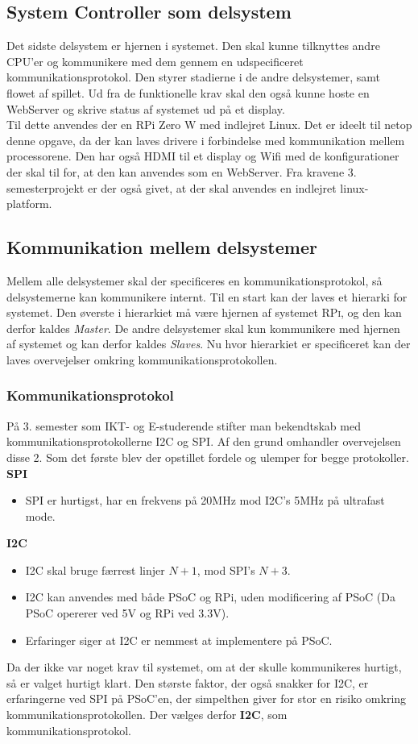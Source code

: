 \documentclass[Rapport/Rapport_main.tex]{subfiles}
\begin{document}
\subsection{System Controller som delsystem}
Det sidste delsystem er hjernen i systemet. Den skal kunne tilknyttes andre CPU'er og kommunikere med dem gennem en udspecificeret kommunikationsprotokol. Den styrer stadierne i de andre delsystemer, samt flowet af spillet. Ud fra de funktionelle krav  skal den også kunne hoste en WebServer og skrive status af systemet ud på et display.\\
Til dette anvendes der en RPi Zero W med indlejret Linux. Det er ideelt til netop denne opgave, da der kan laves drivere i forbindelse med kommunikation mellem processorene. Den har også HDMI til et display og  Wifi med de konfigurationer der skal til for, at den kan anvendes som en WebServer. Fra kravene 3. semesterprojekt\cite{Universitet2018} er der også givet, at der skal anvendes en indlejret linux-platform. 

\subsection{Kommunikation mellem delsystemer}
Mellem alle delsystemer skal der specificeres en kommunikationsprotokol, så delsystemerne kan kommunikere internt. Til en start kan der laves et hierarki for systemet. Den øverste i hierarkiet må være hjernen af systemet \textsc{RPi}, og den kan derfor kaldes \textit{Master}. De andre delsystemer skal kun kommunikere med hjernen af systemet og kan derfor kaldes \textit{Slaves}. Nu hvor hierarkiet er specificeret kan der laves overvejelser omkring kommunikationsprotokollen.
\subsubsection{Kommunikationsprotokol}
På 3. semester som IKT- og E-studerende stifter man bekendtskab med kommunikationsprotokollerne I2C\cite{i2c_protocol} og SPI\cite{spi_protocol}. Af den grund omhandler overvejelsen disse 2. Som det første blev der opstillet fordele og ulemper for begge protokoller.\\
\textbf{SPI}
\begin{itemize}
    \item SPI er hurtigst, har en frekvens på 20MHz mod I2C's 5MHz på ultrafast mode.
\end{itemize}
\textbf{I2C}
\begin{itemize}
    \item I2C skal bruge færrest linjer $N+1$, mod SPI's $N+3$.
    \item I2C kan anvendes med både PSoC og RPi, uden modificering af PSoC (Da PSoC opererer ved 5V og RPi ved 3.3V).
    \item Erfaringer siger at I2C er nemmest at implementere på PSoC. 
\end{itemize}
Da der ikke var noget krav til systemet, om at der skulle kommunikeres hurtigt, så er valget hurtigt klart. Den største faktor, der også snakker for I2C, er erfaringerne ved SPI på PSoC'en, der simpelthen giver for stor en risiko omkring kommunikationsprotokollen. Der vælges derfor \textbf{I2C}, som kommunikationsprotokol.
\end{document}
